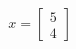 \documentclass[preview]{standalone}
\begin{document}
\begin{align*}
x = \begin{bmatrix} 5 \\ 4 \end{bmatrix}
\end{align*}
\end{document}
